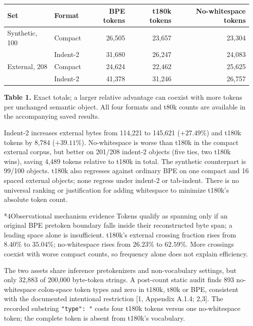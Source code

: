 \documentclass[10pt,a4paper]{article}
\makeatletter
\renewcommand\section{\@startsection{section}{1}{0pt}{1.5ex plus .3ex minus .1ex}{.6ex plus .1ex}{\normalfont\normalsize\bfseries}}
\makeatother
\begin{document}
\begin{center}
\small
\begin{tabular}{llrrr}
\toprule
Set & Format & BPE tokens & t180k tokens & No-whitespace tokens\\
\midrule
Synthetic, 100 & Compact & 26,505 & 23,657 & 23,304\\
 & Indent-2 & 31,680 & 26,247 & 24,083\\
External, 208 & Compact & 24,624 & 22,462 & 25,625\\
 & Indent-2 & 41,378 & 31,246 & 26,757\\
\bottomrule
\end{tabular}
\end{center}
\vspace{-4pt}
{\footnotesize \textbf{Table 1.} Exact totals; a larger relative advantage can
coexist with more tokens per unchanged semantic object. All four formats and
t80k counts are available in the accompanying saved results.}

Indent-2 increases external bytes from 114,221 to 145,621 (\(+27.49\%\))
and t180k tokens by 8,784 (\(+39.11\%\)).
No-whitespace is worse than t180k in the compact external corpus, but better
on 201/208 indent-2 objects (five ties, two t180k wins), saving 4,489 tokens
relative to t180k in total. The synthetic counterpart is 99/100 objects.
t180k also regresses against ordinary BPE on one compact and 16 spaced
external objects; none regress under indent-2 or tab-indent.
There is no universal ranking or justification for adding whitespace to
minimize t180k's absolute token count.

\section*{\normalsize 4\quad Observational mechanism evidence}
Tokens qualify as spanning only if an original BPE pretoken boundary falls
inside their reconstructed byte span; a leading space alone is insufficient.
t180k's external crossing fraction rises from \(8.40\%\) to \(35.04\%\);
no-whitespace rises from \(26.23\%\) to \(62.59\%\).
More crossings coexist with worse compact counts, so frequency alone does
not explain efficiency.

The two assets share inference pretokenizers and non-vocabulary settings,
but only 32,883 of 200,000 byte-token strings.
A post-count static audit finds 893 no-whitespace colon-space token types
and zero in t180k, t80k or BPE, consistent with the documented intentional
restriction [1, Appendix A.1.4; 2,3].
The recorded substring
\verb|"type": "| costs four t180k tokens versus one no-whitespace token;
the complete token is absent from t180k's vocabulary.
\end{document}
